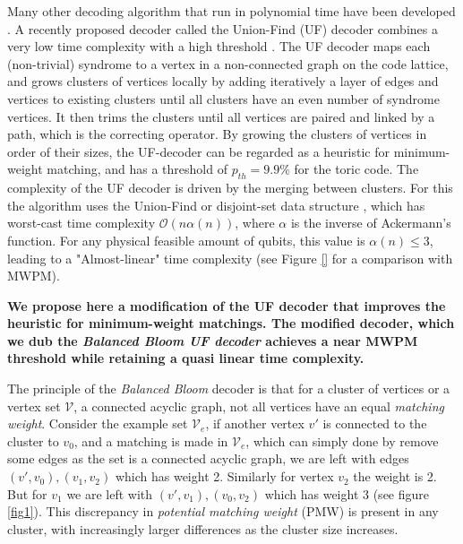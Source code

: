 \documentclass[10pt, a4paper, twoside, titlepage, usenames,dvipsnames]{report}
\begin{document}
Many other decoding algorithm that run in polynomial time have been developed \cite{}. A recently proposed decoder called the Union-Find (UF) decoder combines a very low time complexity with a high threshold \cite{delfosse2017linear, delfosse2017almost}. 
The UF decoder maps each (non-trivial) syndrome to a vertex in a non-connected graph on the code lattice, and grows clusters of vertices locally by adding iteratively a layer of edges and vertices to existing clusters until 
all clusters have an even number of syndrome vertices. It then trims the clusters until all vertices are paired and linked by a path, which is the correcting operator. 
By growing the clusters of vertices in order of their sizes, the UF-decoder can be regarded as a heuristic for minimum-weight matching, and has a threshold of $p_{th} = 9.9\%$ for the toric code. 
The complexity of the UF decoder is driven by the merging between clusters. For this the algorithm uses the Union-Find or disjoint-set data structure \cite{tarjan1975efficiency}, which has worst-cast time complexity $\mathcal{O}(n\alpha(n))$, where $\alpha$ is the inverse of Ackermann's function. For any physical feasible amount of qubits, this value is $\alpha(n) \leq 3$, leading to a "Almost-linear" time complexity (see Figure \ref{} for a comparison with MWPM).

\textbf{We propose here a modification of the UF decoder that improves the heuristic for minimum-weight matchings. The modified decoder, which we dub the \emph{Balanced Bloom UF decoder} achieves a near MWPM threshold while retaining a quasi linear time complexity.}


The principle of the \emph{Balanced Bloom} decoder is that for a cluster of vertices or a vertex set $\mathcal{V}$, a connected acyclic graph, not all vertices have an equal \emph{matching weight}. Consider the example set $\mathcal{V}_e$, if another vertex $v'$ is connected to the cluster to $v_0$, and a matching is made in $\mathcal{V}_e$, which can simply done by remove some edges as the set is a connected acyclic graph, we are left with edges $(v', v_0), (v_1, v_2)$ which has weight 2. Similarly for vertex $v_2$ the weight is 2. But for $v_1$ we are left with $(v', v_1), (v_0, v_2)$ which has weight 3 (see figure \ref{fig1}). This discrepancy in \emph{potential matching weight} (PMW) is present in any cluster, with increasingly larger differences as the cluster size increases.
\end{document}
